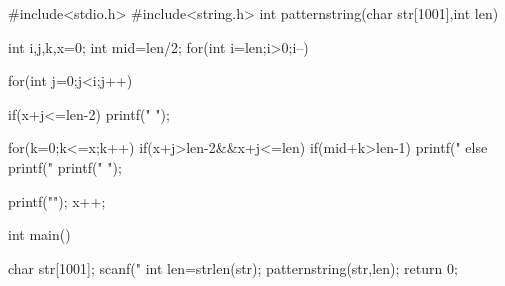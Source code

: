 #include<stdio.h>
#include<string.h>
int patternstring(char str[1001],int len)
{
      int i,j,k,x=0;
      int mid=len/2;
        for(int i=len;i>0;i--)
        {
            for(int j=0;j<i;j++)
            {
            if(x+j<=len-2)
                printf(" ");
              
            for(k=0;k<=x;k++)
            {
                 if(x+j>len-2&&x+j<=len)
                if(mid+k>len-1)
                    printf("%
                else
                    printf("%
            }
            printf(" ");
            }
            printf("\n");
            x++;
        }
}
int main()
{
    
    char str[1001];
    scanf("%
    int len=strlen(str);
    patternstring(str,len);
    return 0;
}